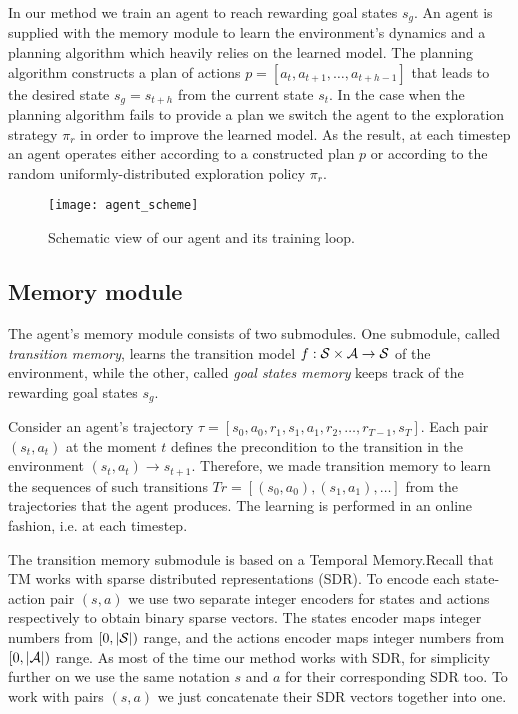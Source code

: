 \documentclass[runningheads]{llncs}
\begin{document}
In our method we train an agent to reach rewarding goal states $s_g$. An agent is supplied with the memory module to learn the environment's dynamics and a planning algorithm which heavily relies on the learned model. The planning algorithm constructs a plan of actions $p = [a_t, a_{t+1}, \dots, a_{t+h-1}]$ that leads to the desired state $s_g = s_{t+h}$ from the current state $s_t$. In the case when the planning algorithm fails to provide a plan we switch the agent to the exploration strategy $\pi_r$ in order to improve the learned model. As the result, at each timestep an agent operates either according to a constructed plan $p$ or according to the random uniformly-distributed exploration policy $\pi_r$.

\begin{figure}
  \centering
  \texttt{[image: agent\_scheme]}
  \caption{Schematic view of our agent and its training loop.} \label{fig_agent_scheme}
\end{figure}

\subsection{Memory module}

The agent's memory module consists of two submodules. One submodule, called \textit{transition memory}, learns the transition model $f: \mathcal{S} \times \mathcal{A} \rightarrow \mathcal{S}$ of the environment, while the other, called \textit{goal states memory} keeps track of the rewarding goal states $s_g$.

Consider an agent's trajectory $\tau = [s_0, a_0, r_1, s_1, a_1, r_2, \dots, r_{T-1}, s_T]$. Each pair $(s_t, a_t)$ at the moment $t$ defines the precondition to the transition in the environment $(s_t, a_t) \rightarrow s_{t+1}$. Therefore, we made transition memory to learn the sequences of such transitions $Tr = [(s_0, a_0), (s_1, a_1), \dots]$ from the trajectories that the agent produces. The learning is performed in an online fashion, i.e. at each timestep.

The transition memory submodule is based on a Temporal Memory.Recall that TM works with sparse distributed representations (SDR). To encode each state-action pair $(s, a)$ we use two separate integer encoders for states and actions respectively to obtain binary sparse vectors. The states encoder maps integer numbers from $[0, |\mathcal{S}|)$ range, and the actions encoder maps integer numbers from $[0, |\mathcal{A}|)$ range. As most of the time our method works with SDR, for simplicity further on we use the same notation $s$ and $a$ for their corresponding SDR too. To work with pairs $(s, a)$ we just concatenate their SDR vectors together into one.
\end{document}
